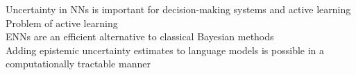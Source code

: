 \documentclass[preview]{standalone}
\begin{document}
Uncertainty in NNs is important for decision-making systems and active learning\\Problem of active learning\\ENNs are an efficient alternative to classical Bayesian methods\\Adding epistemic uncertainty estimates to language models is possible in a computationally tractable manner\\
\end{document}
